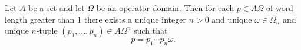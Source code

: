 Let $A$ be a set and let $\Omega$ be an operator domain. Then for each $p \in A\Omega$ of word length greater than $1$ there exists a unique integer $n > 0$ and unique $\omega \in \Omega_n$ and unique $n$-tuple $(p_1, \ldots, p_n) \in A\Omega^n$ such that
$$p = p_1 \cdots p_n \omega.$$
